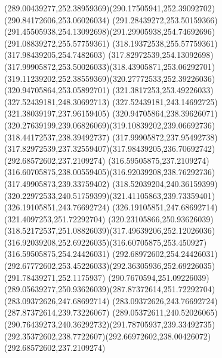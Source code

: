 {{{\curveto(289.00439277,252.38959369)(290.17505941,252.39092702)(290.84172606,253.06026034)
\curveto(291.28439272,253.50159366)(291.45505938,254.13092698)(291.29905938,254.74692696)
\lineto(291.08839272,255.57759361)
\lineto(318.19372538,255.57759361)
\lineto(317.98439205,254.7482603)
\curveto(317.82972539,254.13092698)(317.99905872,253.50026033)(318.43905871,253.06292701)
\curveto(319.11239202,252.38559369)(320.27772533,252.39226036)(320.94705864,253.05892701)
\lineto(321.3817253,253.49226033)
\lineto(327.52439181,248.30692713)
\lineto(327.52439181,243.14692725)
\lineto(321.38039197,237.96159405)
\lineto(320.94705864,238.39626071)
\curveto(320.27639199,239.06826069)(319.10839202,239.06692736)(318.44172537,238.39492737)
\curveto(317.99905872,237.95492738)(317.82972539,237.32559407)(317.98439205,236.70692742)
\closepath
\moveto(292.68572602,237.2109274)
\lineto(316.59505875,237.2109274)
\curveto(316.60705875,238.00559405)(316.92039208,238.76292736)(317.49905873,239.33759402)
\curveto(318.52039204,240.36159399)(320.22972533,240.51759399)(321.41105863,239.73359401)
\lineto(326.19105851,243.76692724)
\lineto(326.19105851,247.68692714)
\lineto(321.4097253,251.72292704)
\curveto(320.23105866,250.93626039)(318.52172537,251.08826039)(317.49639206,252.12026036)
\curveto(316.92039208,252.69226035)(316.60705875,253.450927)(316.59505875,254.24426031)
\lineto(292.68972602,254.24426031)
\curveto(292.67772602,253.45226033)(292.36305936,252.69226035)(291.78439271,252.1175937)
\curveto(290.7670594,251.09226039)(289.05639277,250.93626039)(287.87372614,251.72292704)
\lineto(283.09372626,247.68692714)
\lineto(283.09372626,243.76692724)
\lineto(287.87372614,239.73226067)
\curveto(289.05372611,240.52026065)(290.76439273,240.36292732)(291.78705937,239.33492735)
\curveto(292.35372602,238.7722607)(292.66972602,238.00426072)(292.68572602,237.2109274)
}
}
{
}
{
}}
